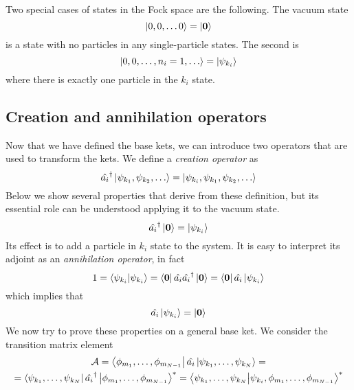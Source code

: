 Two special cases of states in the Fock space are the following. The vacuum state
\begin{equation}
    \ket{0,0,\dots0} = \ket{\mathbf{0}}
\end{equation}
is a state with no particles in any single-particle states. The second is
\begin{equation}
    \ket{0,0,\dots, n_i = 1, \dots} = \ket{\psi_{k_i}}
\end{equation}
where there is exactly one particle in the $k_i$ state.

\subsection{Creation and annihilation operators}
Now that we have defined the base kets, we can introduce two operators that are used to transform the kets. We define a \emph{creation operator} as
\begin{equation}
    \hat{a_i}^\dagger \ket{\psi_{k_1}, \psi_{k_2}, \dots} = \ket{\psi_{k_i},\psi_{k_1}, \psi_{k_2}, \dots}
\end{equation}
Below we show several properties that derive from these definition, but its essential role can be understood applying it to the vacuum state.
\begin{equation}
    \hat{a_i}^\dagger \ket{\mathbf{0}} = \ket{\psi_{k_i}}
\end{equation}
Its effect is to add a particle in $k_i$ state to the system. It is easy to interpret its adjoint as an \emph{annihilation operator}, in fact
\begin{equation}
    1 = \braket{\psi_{k_i}}{\psi_{k_i}} = \bra{\mathbf{0}}\hat{a_i}\hat{a_i}^\dagger\ket{\mathbf{0}} = \bra{\mathbf{0}}\hat{a_i}\ket{\psi_{k_i}}
\end{equation}
which implies that
\begin{equation}
    \hat{a_i}\ket{\psi_{k_i}} = \ket{\mathbf{0}}
\end{equation}
We now try to prove these properties on a general base ket. We consider the transition matrix element
\begin{multline} \label{eq:annihilation_matrix}
    \mathcal{A} =  \bra{\phi_{m_1}, \dots, \phi_{m_{N-1}}} \hat{a_i} \ket{\psi_{k_1}, \dots, \psi_{k_N}} =
    \\ =  \bra{\psi_{k_1}, \dots, \psi_{k_N}} \hat{a_i}^\dagger \ket{\phi_{m_1}, \dots, \phi_{m_{N-1}}}^*
    = \bra{\psi_{k_1}, \dots, \psi_{k_N}} \ket{\psi_{k_i}, \phi_{m_1}, \dots, \phi_{m_{N-1}}}^*
\end{multline}

